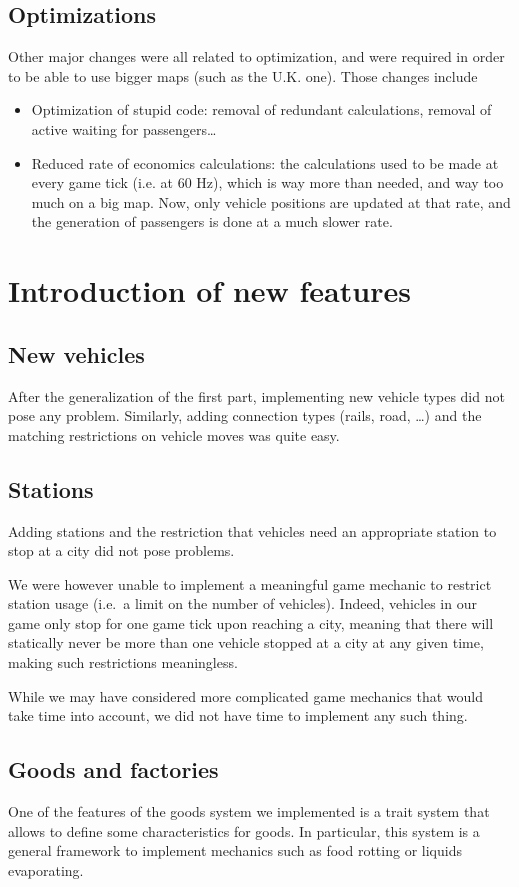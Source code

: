 \documentclass{article}
\begin{document}
\subsection{Optimizations}
Other major changes were all related to optimization, and were required in order to be able to use
bigger maps (such as the U.K. one). Those changes include
\begin{itemize}
\item Optimization of stupid code: removal of redundant calculations, removal of active waiting for passengers\dots
\item Reduced rate of economics calculations: the calculations used to be made at every game tick (i.e. at 60 Hz),
which is way more than needed, and way too much on a big map.
Now, only vehicle positions are updated at that rate, and the generation of passengers is done at a much slower rate.
\end{itemize}


\section{Introduction of new features}
\subsection{New vehicles}
After the generalization of the first part, implementing new vehicle types did not pose any problem.
Similarly, adding connection types (rails, road, \dots) and the matching restrictions on vehicle moves was quite easy.

\subsection{Stations}
Adding stations and the restriction that vehicles need an appropriate station to stop at a city did not pose problems. 

We were however unable to implement a meaningful game mechanic to restrict station usage (i.e.\ a limit on the number of vehicles).
Indeed, vehicles in our game only stop for one game tick upon reaching a city, meaning that there
will statically never be more than one vehicle stopped at a city at any given time, making such restrictions meaningless.

While we may have considered more complicated game mechanics that would take time into account,
we did not have time to implement any such thing. 

\subsection{Goods and factories}
One of the features of the goods system we implemented is a trait system that allows to define some characteristics
for goods. In particular, this system is a general framework to implement mechanics such as food rotting or liquids evaporating.
\end{document}
